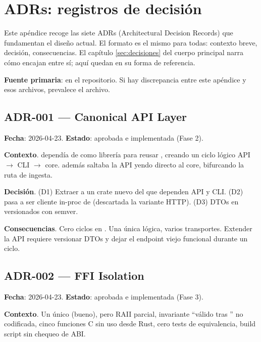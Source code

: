 \chapter{ADRs: registros de decisión}
\label{sec:adrs}

Este apéndice recoge las siete ADRs (Architectural Decision
Records) que fundamentan el diseño actual. El formato es el mismo para
todas: contexto breve, decisión, consecuencias. El capítulo
\ref{sec:decisiones} del cuerpo principal narra cómo encajan entre
sí; aquí quedan en su forma de referencia.

\textbf{Fuente primaria}: 
en el repositorio. Si hay discrepancia entre este apéndice y esos
archivos, prevalece el archivo.

\section*{ADR-001 — Canonical API Layer}

\textbf{Fecha}: 2026-04-23. \textbf{Estado}: aprobada e
implementada (Fase 2).

\textbf{Contexto}.  dependía de
 como librería para reusar
, creando un ciclo lógico
API $\to$ CLI $\to$ core.  además saltaba la API
yendo directo al core, bifurcando la ruta de ingesta.

\textbf{Decisión}. (D1) Extraer  a un
crate nuevo  del que dependen API y CLI.
(D2)  pasa a ser cliente in-proc de
 (descartada la variante HTTP). (D3) DTOs
en  versionados con semver.

\textbf{Consecuencias}. Cero ciclos en . Una
única lógica, varios transportes. Extender la API requiere versionar
DTOs y dejar el endpoint viejo funcional durante un ciclo.

\section*{ADR-002 — FFI Isolation}

\textbf{Fecha}: 2026-04-23. \textbf{Estado}: aprobada e
implementada (Fase 3).

\textbf{Contexto}. Un único  (bueno), pero RAII
parcial, invariante ``válido tras '' no codificada,
cinco funciones C sin uso desde Rust, cero tests de equivalencia,
build script sin chequeo de ABI.

